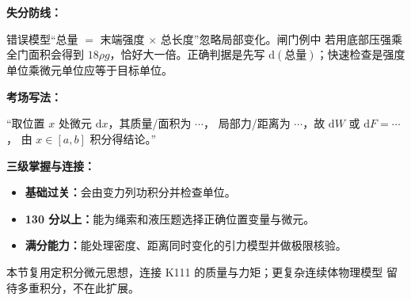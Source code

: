 \begin{knowledgeBox}
\textbf{失分防线：}

错误模型“总量 \(=\) 末端强度 \(\times\) 总长度”忽略局部变化。闸门例中
若用底部压强乘全门面积会得到 \(18\rho g\)，恰好大一倍。正确判据是先写
\(\mathrm d(\text{总量})\)；快速检查是强度单位乘微元单位应等于目标单位。

\textbf{考场写法：}

“取位置 \(x\) 处微元 \(\mathrm dx\)，其质量/面积为 \(\cdots\)，
局部力/距离为 \(\cdots\)，故 \(\mathrm dW\) 或 \(\mathrm dF=\cdots\)，
由 \(x\in[a,b]\) 积分得结论。”

\textbf{三级掌握与连接：}
\begin{itemize}
  \item \textbf{基础过关：}会由变力列功积分并检查单位。
  \item \textbf{130 分以上：}能为绳索和液压题选择正确位置变量与微元。
  \item \textbf{满分能力：}能处理密度、距离同时变化的引力模型并做极限核验。
\end{itemize}
本节复用定积分微元思想，连接 K111 的质量与力矩；更复杂连续体物理模型
留待多重积分，不在此扩展。
\end{knowledgeBox}


\par

